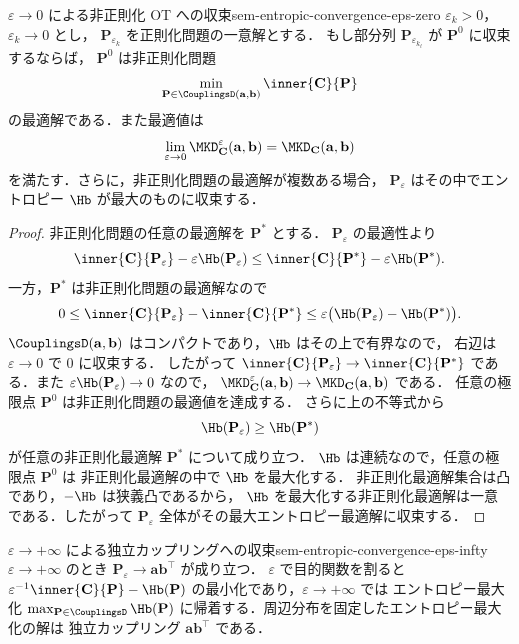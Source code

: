 \begin{theorem}{$\varepsilon \to 0$ による非正則化 OT への収束}{sem-entropic-convergence-eps-zero}
  $\varepsilon_k > 0$，$\varepsilon_k \to 0$ とし，
  $\mathbf{P}_{\varepsilon_k}$ を正則化問題の一意解とする．
  もし部分列 $\mathbf{P}_{\varepsilon_{k_\ell}}$ が
  $\mathbf{P}^0$ に収束するならば，
  $\mathbf{P}^0$ は非正則化問題
  \[
    \min_{\mathbf{P} \in \CouplingsD(\mathbf{a}, \mathbf{b})}
    \inner{\mathbf{C}}{\mathbf{P}}
  \]
  の最適解である．また最適値は
  \[
    \lim_{\varepsilon \to 0}
    \MKD_{\mathbf{C}}^\varepsilon(\mathbf{a},\mathbf{b})
    =
    \MKD_{\mathbf{C}}(\mathbf{a},\mathbf{b})
  \]
  を満たす．さらに，非正則化問題の最適解が複数ある場合，
  $\mathbf{P}_\varepsilon$ はその中でエントロピー $\Hb$ が最大のものに収束する．
\end{theorem}

\begin{proof}
  非正則化問題の任意の最適解を $\mathbf{P}^*$ とする．
  $\mathbf{P}_\varepsilon$ の最適性より
  \[
    \inner{\mathbf{C}}{\mathbf{P}_\varepsilon}
    - \varepsilon\Hb(\mathbf{P}_\varepsilon)
    \leq
    \inner{\mathbf{C}}{\mathbf{P}^*}
    - \varepsilon\Hb(\mathbf{P}^*).
  \]
  一方，$\mathbf{P}^*$ は非正則化問題の最適解なので
  \[
    0
    \leq
    \inner{\mathbf{C}}{\mathbf{P}_\varepsilon}
    - \inner{\mathbf{C}}{\mathbf{P}^*}
    \leq
    \varepsilon\bigl(\Hb(\mathbf{P}_\varepsilon)-\Hb(\mathbf{P}^*)\bigr).
  \]
  $\CouplingsD(\mathbf{a}, \mathbf{b})$ はコンパクトであり，$\Hb$ はその上で有界なので，
  右辺は $\varepsilon \to 0$ で $0$ に収束する．
  したがって
  $\inner{\mathbf{C}}{\mathbf{P}_\varepsilon}
  \to \inner{\mathbf{C}}{\mathbf{P}^*}$ である．また
  $\varepsilon\Hb(\mathbf{P}_\varepsilon) \to 0$ なので，
  $\MKD_{\mathbf{C}}^\varepsilon(\mathbf{a},\mathbf{b})
  \to \MKD_{\mathbf{C}}(\mathbf{a},\mathbf{b})$ である．
  任意の極限点 $\mathbf{P}^0$ は非正則化問題の最適値を達成する．
  さらに上の不等式から
  \[
    \Hb(\mathbf{P}_\varepsilon) \geq \Hb(\mathbf{P}^*)
  \]
  が任意の非正則化最適解 $\mathbf{P}^*$ について成り立つ．
  $\Hb$ は連続なので，任意の極限点 $\mathbf{P}^0$ は
  非正則化最適解の中で $\Hb$ を最大化する．
  非正則化最適解集合は凸であり，$-\Hb$ は狭義凸であるから，
  $\Hb$ を最大化する非正則化最適解は一意である．したがって
  $\mathbf{P}_\varepsilon$ 全体がその最大エントロピー最適解に収束する．
\end{proof}

\begin{remark}{$\varepsilon \to +\infty$ による独立カップリングへの収束}{sem-entropic-convergence-eps-infty}
  $\varepsilon \to +\infty$ のとき
  $\mathbf{P}_\varepsilon \to \mathbf{a}\mathbf{b}^\top$ が成り立つ．
  $\varepsilon$ で目的関数を割ると
  $\varepsilon^{-1}\inner{\mathbf{C}}{\mathbf{P}} - \Hb(\mathbf{P})$
  の最小化であり，$\varepsilon \to +\infty$ では
  エントロピー最大化
  $\max_{\mathbf{P} \in \CouplingsD} \Hb(\mathbf{P})$
  に帰着する．周辺分布を固定したエントロピー最大化の解は
  独立カップリング $\mathbf{a}\mathbf{b}^\top$ である．
\end{remark}

